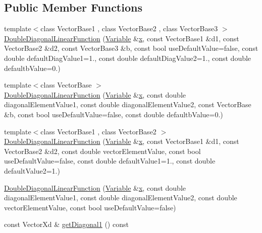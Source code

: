 \subsection*{Public Member Functions}
\begin{DoxyCompactItemize}
\item 
{\footnotesize template$<$class Vector\+Base1 , class Vector\+Base2 , class Vector\+Base3 $>$ }\\\hyperlink{classocra_1_1DoubleDiagonalLinearFunction_a790df03af5df25353682965f7a556aec}{Double\+Diagonal\+Linear\+Function} (\hyperlink{classocra_1_1Variable}{Variable} \&\hyperlink{classocra_1_1Function_a28825886d1f149c87b112ec2ec1dd486}{x}, const Vector\+Base1 \&d1, const Vector\+Base2 \&d2, const Vector\+Base3 \&b, const bool use\+Default\+Value=false, const double default\+Diag\+Value1=1., const double default\+Diag\+Value2=1., const double defaultb\+Value=0.)
\item 
{\footnotesize template$<$class Vector\+Base $>$ }\\\hyperlink{classocra_1_1DoubleDiagonalLinearFunction_a96c59d997d8ec798745389d98c2d5e63}{Double\+Diagonal\+Linear\+Function} (\hyperlink{classocra_1_1Variable}{Variable} \&\hyperlink{classocra_1_1Function_a28825886d1f149c87b112ec2ec1dd486}{x}, const double diagonal\+Element\+Value1, const double diagonal\+Element\+Value2, const Vector\+Base \&b, const bool use\+Default\+Value=false, const double defaultb\+Value=0.)
\item 
{\footnotesize template$<$class Vector\+Base1 , class Vector\+Base2 $>$ }\\\hyperlink{classocra_1_1DoubleDiagonalLinearFunction_a7403903ccd31cec18bf665aefd1f4900}{Double\+Diagonal\+Linear\+Function} (\hyperlink{classocra_1_1Variable}{Variable} \&\hyperlink{classocra_1_1Function_a28825886d1f149c87b112ec2ec1dd486}{x}, const Vector\+Base1 \&d1, const Vector\+Base2 \&d2, const double vector\+Element\+Value, const bool use\+Default\+Value=false, const double default\+Value1=1., const double default\+Value2=1.)
\item 
\hyperlink{classocra_1_1DoubleDiagonalLinearFunction_aa46fa50d5728569eb834438dfd3a9228}{Double\+Diagonal\+Linear\+Function} (\hyperlink{classocra_1_1Variable}{Variable} \&\hyperlink{classocra_1_1Function_a28825886d1f149c87b112ec2ec1dd486}{x}, const double diagonal\+Element\+Value1, const double diagonal\+Element\+Value2, const double vector\+Element\+Value, const bool use\+Default\+Value=false)
\item 
const Vector\+Xd \& \hyperlink{classocra_1_1DoubleDiagonalLinearFunction_a7d1cea2c8b94bc70854377779b49c966}{get\+Diagonal1} () const

\end{DoxyCompactItemize}

